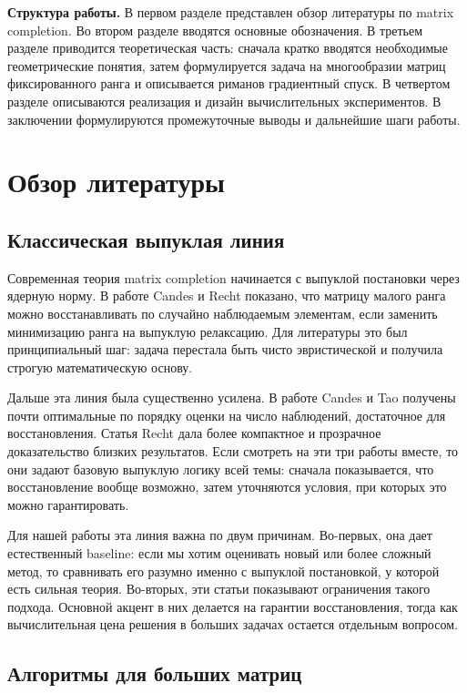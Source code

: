 \documentclass[a4paper,12pt]{article}
\begin{document}
\textbf{Структура работы.} В первом разделе представлен обзор литературы по matrix completion. Во втором разделе вводятся основные обозначения. В третьем разделе приводится теоретическая часть: сначала кратко вводятся необходимые геометрические понятия, затем формулируется задача на многообразии матриц фиксированного ранга и описывается риманов градиентный спуск. В четвертом разделе описываются реализация и дизайн вычислительных экспериментов. В заключении формулируются промежуточные выводы и дальнейшие шаги работы.

\newpage

\section{Обзор литературы}
\label{sec:literature}

\subsection{Классическая выпуклая линия}

Современная теория matrix completion начинается с выпуклой постановки через ядерную норму. В работе Candes и Recht \cite{candes-recht} показано, что матрицу малого ранга можно восстанавливать по случайно наблюдаемым элементам, если заменить минимизацию ранга на выпуклую релаксацию. Для литературы это был принципиальный шаг: задача перестала быть чисто эвристической и получила строгую математическую основу.

Дальше эта линия была существенно усилена. В работе Candes и Tao \cite{candes-tao} получены почти оптимальные по порядку оценки на число наблюдений, достаточное для восстановления. Статья Recht \cite{recht} дала более компактное и прозрачное доказательство близких результатов. Если смотреть на эти три работы вместе, то они задают базовую выпуклую логику всей темы: сначала показывается, что восстановление вообще возможно, затем уточняются условия, при которых это можно гарантировать.

Для нашей работы эта линия важна по двум причинам. Во-первых, она дает естественный baseline: если мы хотим оценивать новый или более сложный метод, то сравнивать его разумно именно с выпуклой постановкой, у которой есть сильная теория. Во-вторых, эти статьи показывают ограничения такого подхода. Основной акцент в них делается на гарантии восстановления, тогда как вычислительная цена решения в больших задачах остается отдельным вопросом.

\subsection{Алгоритмы для больших матриц}
\end{document}
